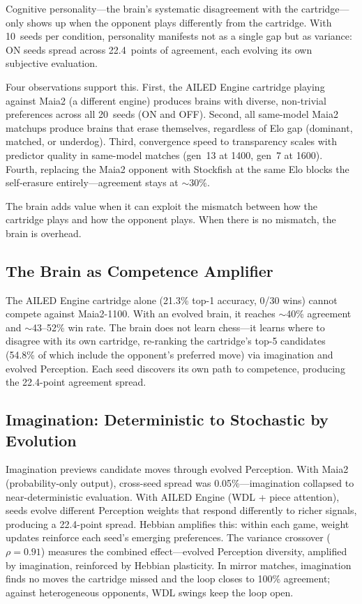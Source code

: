 \documentclass[11pt,a4paper]{article}
\begin{document}
Cognitive personality---the brain's systematic disagreement with the cartridge---only shows up when the opponent plays differently from the cartridge.
With 10~seeds per condition, personality manifests not as a single gap but as variance: ON seeds spread across 22.4~points of agreement, each evolving its own subjective evaluation.

Four observations support this.
First, the AILED Engine cartridge playing against Maia2 (a different engine) produces brains with diverse, non-trivial preferences across all 20~seeds (ON and OFF).
Second, all same-model Maia2 matchups produce brains that erase themselves, regardless of Elo gap (dominant, matched, or underdog).
Third, convergence speed to transparency scales with predictor quality in same-model matches (gen~13 at 1400, gen~7 at 1600).
Fourth, replacing the Maia2 opponent with Stockfish at the same Elo blocks the self-erasure entirely---agreement stays at $\sim$30\%.

The brain adds value when it can exploit the mismatch between how the cartridge plays and how the opponent plays.
When there is no mismatch, the brain is overhead.

\subsection{The Brain as Competence Amplifier}

The AILED Engine cartridge alone (21.3\% top-1 accuracy, 0/30 wins) cannot compete against Maia2-1100.
With an evolved brain, it reaches $\sim$40\% agreement and $\sim$43--52\% win rate.
The brain does not learn chess---it learns where to disagree with its own cartridge, re-ranking the cartridge's top-5 candidates (54.8\% of which include the opponent's preferred move) via imagination and evolved Perception.
Each seed discovers its own path to competence, producing the 22.4-point agreement spread.

\subsection{Imagination: Deterministic to Stochastic by Evolution}

Imagination previews candidate moves through evolved Perception.
With Maia2 (probability-only output), cross-seed spread was 0.05\%---imagination collapsed to near-deterministic evaluation.
With AILED Engine (WDL + piece attention), seeds evolve different Perception weights that respond differently to richer signals, producing a 22.4-point spread.
Hebbian amplifies this: within each game, weight updates reinforce each seed's emerging preferences.
The variance crossover ($\rho = 0.91$) measures the combined effect---evolved Perception diversity, amplified by imagination, reinforced by Hebbian plasticity.
In mirror matches, imagination finds no moves the cartridge missed and the loop closes to 100\% agreement; against heterogeneous opponents, WDL swings keep the loop open.
\end{document}
